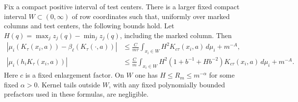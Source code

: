 \documentclass[11pt]{article}
\begin{document}
\begin{lemma}\label{comparisons}
Fix a compact positive interval of test centers. There is a larger
fixed compact interval $W\subset(0,\infty)$ of row coordinates such
that, uniformly over marked columns and test centers, the following
bounds hold. Let
$H(q)=\max_j z_j(q)-\min_j z_j(q)$, including the marked column.
Then
\begin{align}
 |\mu_i(K_\tau(x_i,a))-\beta_\ell(K_\tau(\cdot,a))|
 &\le \frac C{m\tau}\int_{x_i\in W}
                H^2K_{c\tau}(x_i,a)\,d\mu_i+m^{-A},\label{unmarked}\\
 |\mu_i(h_iK_\tau(x_i,a))|
 &\le \frac C m\int_{x_i\in W}
 H^2(1+b^{-1}+Hb^{-2})K_{c\tau}(x_i,a)\,d\mu_i+m^{-A}.
 \label{marked}
\end{align}
Here $c$ is a fixed enlargement factor. On $W$ one has
$H\le R_m\le m^{-\alpha}$ for some fixed $\alpha>0$.
Kernel tails outside $W$, with any fixed polynomially bounded
prefactors used in these formulas, are negligible.
\end{lemma}
\end{document}
